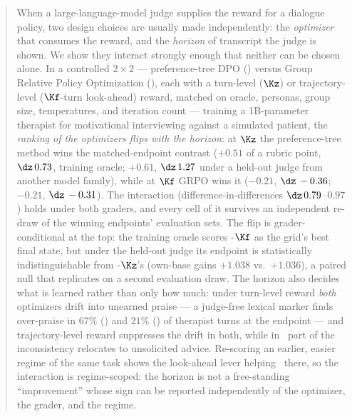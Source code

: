 \begin{abstract}
When a large-language-model judge supplies the reward for a dialogue policy, two design choices
are usually made independently: the \emph{optimizer} that consumes the reward, and the
\emph{horizon} of transcript the judge is shown. We show they interact strongly enough that
neither can be chosen alone. In a controlled $2 \times 2$ --- preference-tree DPO (\PTO) versus
Group Relative Policy Optimization (\GRPO), each with a turn-level ($\Kz$) or trajectory-level
($\Kf$-turn look-ahead) reward, matched on oracle, personas, group size, temperatures, and
iteration count --- training a 1B-parameter therapist for motivational interviewing against a
simulated patient, the \emph{ranking of the optimizers flips with the horizon}: at $\Kz$ the
preference-tree method wins the matched-endpoint contrast ($+0.51$ of a rubric point,
$\dz\,0.73$, training oracle; $+0.61$, $\dz\,1.27$ under a held-out judge from another model
family), while at $\Kf$ GRPO wins it ($-0.21$, $\dz\,-0.36$; $-0.21$, $\dz\,-0.31$). The
interaction (difference-in-differences $\dz\,0.79$--$0.97$) holds under both graders, and every
cell of it survives an independent re-draw of the winning endpoints' evaluation sets. The flip
is grader-conditional at the top: the training oracle scores \GRPO-$\Kf$ as the grid's best
final state, but under the held-out judge its endpoint is statistically indistinguishable from
\PTO-$\Kz$'s (own-base gains $+1.038$ vs.\ $+1.036$), a paired null that replicates on a second
evaluation draw. The horizon also decides what is learned rather than only how much: under turn-level
reward \emph{both} optimizers drift into unearned praise --- a judge-free lexical marker finds
over-praise in $67\%$ (\GRPO) and $21\%$ (\PTO) of therapist turns at the endpoint --- and
trajectory-level reward suppresses the drift in both, while in \PTO\ part of the inconsistency
relocates to unsolicited advice. Re-scoring an earlier, easier regime of the same task shows the
look-ahead lever helping \PTO\ there, so the interaction is regime-scoped: the horizon is not a
free-standing ``improvement'' whose sign can be reported independently of the optimizer, the
grader, and the regime.
\end{abstract}
